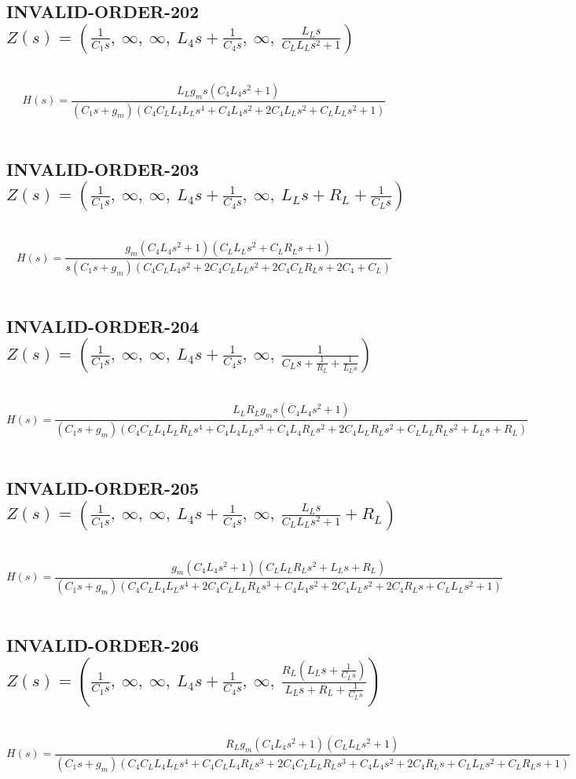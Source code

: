 \documentclass{article}
\begin{document}
\subsection{INVALID-ORDER-202 $Z(s) = \left( \frac{1}{C_{1} s}, \  \infty, \  \infty, \  L_{4} s + \frac{1}{C_{4} s}, \  \infty, \  \frac{L_{L} s}{C_{L} L_{L} s^{2} + 1}\right)$ } \ 
\textbf{\[H(s) = \frac{L_{L} g_{m} s \left(C_{4} L_{4} s^{2} + 1\right)}{\left(C_{1} s + g_{m}\right) \left(C_{4} C_{L} L_{4} L_{L} s^{4} + C_{4} L_{4} s^{2} + 2 C_{4} L_{L} s^{2} + C_{L} L_{L} s^{2} + 1\right)}\] } \ 
\subsection{INVALID-ORDER-203 $Z(s) = \left( \frac{1}{C_{1} s}, \  \infty, \  \infty, \  L_{4} s + \frac{1}{C_{4} s}, \  \infty, \  L_{L} s + R_{L} + \frac{1}{C_{L} s}\right)$ } \ 
\textbf{\[H(s) = \frac{g_{m} \left(C_{4} L_{4} s^{2} + 1\right) \left(C_{L} L_{L} s^{2} + C_{L} R_{L} s + 1\right)}{s \left(C_{1} s + g_{m}\right) \left(C_{4} C_{L} L_{4} s^{2} + 2 C_{4} C_{L} L_{L} s^{2} + 2 C_{4} C_{L} R_{L} s + 2 C_{4} + C_{L}\right)}\] } \ 
\subsection{INVALID-ORDER-204 $Z(s) = \left( \frac{1}{C_{1} s}, \  \infty, \  \infty, \  L_{4} s + \frac{1}{C_{4} s}, \  \infty, \  \frac{1}{C_{L} s + \frac{1}{R_{L}} + \frac{1}{L_{L} s}}\right)$ } \ 
\textbf{\[H(s) = \frac{L_{L} R_{L} g_{m} s \left(C_{4} L_{4} s^{2} + 1\right)}{\left(C_{1} s + g_{m}\right) \left(C_{4} C_{L} L_{4} L_{L} R_{L} s^{4} + C_{4} L_{4} L_{L} s^{3} + C_{4} L_{4} R_{L} s^{2} + 2 C_{4} L_{L} R_{L} s^{2} + C_{L} L_{L} R_{L} s^{2} + L_{L} s + R_{L}\right)}\] } \ 
\subsection{INVALID-ORDER-205 $Z(s) = \left( \frac{1}{C_{1} s}, \  \infty, \  \infty, \  L_{4} s + \frac{1}{C_{4} s}, \  \infty, \  \frac{L_{L} s}{C_{L} L_{L} s^{2} + 1} + R_{L}\right)$ } \ 
\textbf{\[H(s) = \frac{g_{m} \left(C_{4} L_{4} s^{2} + 1\right) \left(C_{L} L_{L} R_{L} s^{2} + L_{L} s + R_{L}\right)}{\left(C_{1} s + g_{m}\right) \left(C_{4} C_{L} L_{4} L_{L} s^{4} + 2 C_{4} C_{L} L_{L} R_{L} s^{3} + C_{4} L_{4} s^{2} + 2 C_{4} L_{L} s^{2} + 2 C_{4} R_{L} s + C_{L} L_{L} s^{2} + 1\right)}\] } \ 
\subsection{INVALID-ORDER-206 $Z(s) = \left( \frac{1}{C_{1} s}, \  \infty, \  \infty, \  L_{4} s + \frac{1}{C_{4} s}, \  \infty, \  \frac{R_{L} \left(L_{L} s + \frac{1}{C_{L} s}\right)}{L_{L} s + R_{L} + \frac{1}{C_{L} s}}\right)$ } \ 
\textbf{\[H(s) = \frac{R_{L} g_{m} \left(C_{4} L_{4} s^{2} + 1\right) \left(C_{L} L_{L} s^{2} + 1\right)}{\left(C_{1} s + g_{m}\right) \left(C_{4} C_{L} L_{4} L_{L} s^{4} + C_{4} C_{L} L_{4} R_{L} s^{3} + 2 C_{4} C_{L} L_{L} R_{L} s^{3} + C_{4} L_{4} s^{2} + 2 C_{4} R_{L} s + C_{L} L_{L} s^{2} + C_{L} R_{L} s + 1\right)}\] } \ 
\end{document}
